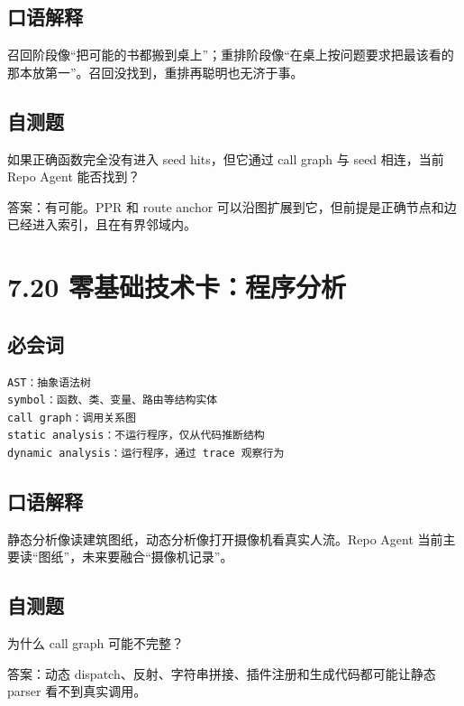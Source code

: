 \documentclass[UTF8,12pt,openany]{ctexbook}
\begin{document}
\subsection{口语解释}

召回阶段像“把可能的书都搬到桌上”；重排阶段像“在桌上按问题要求把最该看的那本放第一”。召回没找到，重排再聪明也无济于事。\par

\subsection{自测题}

如果正确函数完全没有进入 seed hits，但它通过 call graph 与 seed 相连，当前 Repo Agent 能否找到？\par

答案：有可能。PPR 和 route anchor 可以沿图扩展到它，但前提是正确节点和边已经进入索引，且在有界邻域内。\par

\section{7.20 零基础技术卡：程序分析}

\subsection{必会词}

\begin{lstlisting}
AST：抽象语法树
symbol：函数、类、变量、路由等结构实体
call graph：调用关系图
static analysis：不运行程序，仅从代码推断结构
dynamic analysis：运行程序，通过 trace 观察行为
\end{lstlisting}

\subsection{口语解释}

静态分析像读建筑图纸，动态分析像打开摄像机看真实人流。Repo Agent 当前主要读“图纸”，未来要融合“摄像机记录”。\par

\subsection{自测题}

为什么 call graph 可能不完整？\par

答案：动态 dispatch、反射、字符串拼接、插件注册和生成代码都可能让静态 parser 看不到真实调用。\par
\end{document}
